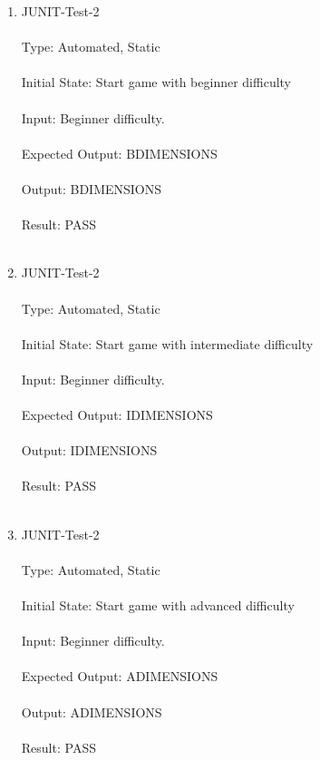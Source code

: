 \documentclass[12pt, titlepage]{article}
\begin{document}
\begin{enumerate}
\item{JUNIT-Test-2}\\\\
Type: Automated, Static\\\\			
Initial State: Start game with beginner difficulty\\\\
Input: Beginner difficulty.\\\\					
Expected Output: BDIMENSIONS\\\\
Output: BDIMENSIONS\\\\
Result: PASS\\\\

\newpage
\item{JUNIT-Test-2}\\\\
Type: Automated, Static\\\\			
Initial State: Start game with intermediate difficulty\\\\
Input: Beginner difficulty.\\\\					
Expected Output: IDIMENSIONS\\\\
Output: IDIMENSIONS\\\\
Result: PASS\\\\

\item{JUNIT-Test-2}\\\\
Type: Automated, Static\\\\			
Initial State: Start game with advanced difficulty\\\\
Input: Beginner difficulty.\\\\					
Expected Output: ADIMENSIONS\\\\
Output: ADIMENSIONS\\\\
Result: PASS\\\\

\end{enumerate}
\end{document}
